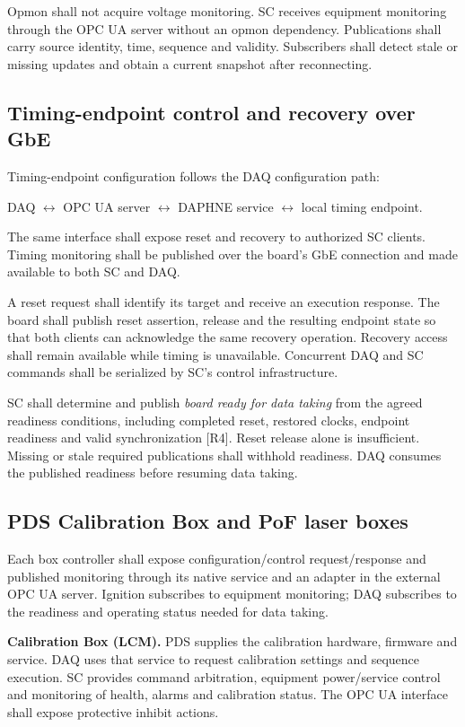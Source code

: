 Opmon shall not acquire voltage monitoring. SC receives equipment monitoring
through the OPC UA server without an opmon dependency. Publications shall
carry source identity, time, sequence and validity. Subscribers shall detect
stale or missing updates and obtain a current snapshot after reconnecting.

\subsection{Timing-endpoint control and recovery over GbE}

Timing-endpoint configuration follows the DAQ configuration path:
\begin{center}
DAQ $\longleftrightarrow$ OPC UA server $\longleftrightarrow$
DAPHNE service $\longleftrightarrow$ local timing endpoint.
\end{center}
The same interface shall expose reset and recovery to authorized SC clients.
Timing monitoring shall be published over the board's GbE connection and
made available to both SC and DAQ.

A reset request shall identify its target and receive an execution response.
The board shall publish reset assertion, release and the resulting endpoint
state so that both clients can acknowledge the same recovery operation.
Recovery access shall remain available while timing is unavailable. Concurrent
DAQ and SC commands shall be serialized by SC's control infrastructure.

SC shall determine and publish \emph{board ready for data taking} from the
agreed readiness conditions, including completed reset, restored clocks,
endpoint readiness and valid synchronization [R4]. Reset release alone is
insufficient. Missing or stale required publications shall withhold readiness.
DAQ consumes the published readiness before resuming data taking.

\subsection{PDS Calibration Box and PoF laser boxes}
\label{sec:boxes}

Each box controller shall expose configuration/control request/response and
published monitoring through its native service and an adapter in the external
OPC UA server. Ignition subscribes to equipment monitoring; DAQ subscribes to
the readiness and operating status needed for data taking.

\textbf{Calibration Box (LCM).} PDS supplies the calibration hardware, firmware
and service. DAQ uses that service to request calibration settings and sequence
execution. SC provides command arbitration, equipment power/service control
and monitoring of health, alarms and calibration status. The OPC UA interface
shall expose protective inhibit actions.

